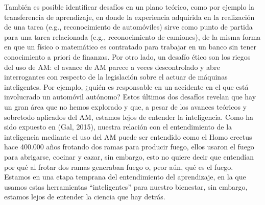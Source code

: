 También es posible identificar desafíos en un plano teórico, como por ejemplo la transferencia de aprendizaje, en donde la experiencia adquirida en la realización de una tarea (e.g., reconocimiento de automóviles) sirve como punto de partida para una tarea relacionada (e.g., reconocimiento de camiones), de la misma forma en que un físico o matemático es contratado para trabajar en un banco sin tener conocimiento a priori de finanzas. Por otro lado, un desafío ético son los riegos del uso de AM: el avance de AM parece a veces descontrolado y abre interrogantes con respecto de la legislación sobre el actuar de máquinas inteligentes. Por ejemplo, ¿quién es responsable en un accidente en el que está involucrado un automóvil autónomo? Estos últimos dos desafíos revelan que hay un gran área que no hemos explorado y que, a pesar de los avances teóricos y sobretodo aplicados del AM, estamos lejos de entender la inteligencia. Como ha sido expuesto en (Gal, 2015), nuestra relación con el entendimiento de la inteligencia mediante el uso del AM puede ser entendido como el Homo erectus hace 400.000 años frotando dos ramas para producir fuego, ellos usaron el fuego para abrigarse, cocinar y cazar, sin embargo, esto no quiere decir que entendían por qué al frotar dos ramas generaban fuego o, peor aún, qué es el fuego. Estamos en una etapa temprana del entendimiento del aprendizaje, en la que usamos estas herramientas “inteligentes” para nuestro bienestar, sin embargo, estamos lejos de entender la ciencia que hay detrás. 



